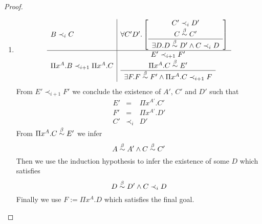 \begin{lemma}
\begin{proof}
\begin{enumerate}
        \item
            $$
            \begin{array}{l|l}
                B \prec_i C
                &
                \forall C' D'.
                \left[
                    \begin{array}{c} 
                        C' \prec_i D'
                        \\
                        C \stackrel{\beta}{\sim} C'
                     \\ \hline 
                        \exists D. D \stackrel{\beta}{\sim} D' \land C \prec_i D
                    \end{array}
                \right]
                \\
                \hline
                \Pi x^A. B \prec_{i+1} \Pi x^A.C
                &
                \begin{array}{c} 
                    E' \prec_{i+1} F'
                    \\
                    \Pi x^A.C \stackrel{\beta}{\sim} E'
                 \\ \hline 
                    \exists F.
                    F \stackrel{\beta}{\sim} F'
                    \land
                    \Pi x^A. C \prec_{i+1} F
                \end{array}
            \end{array}
            $$
            From $E' \prec_{i+1} F'$ we conclude the existence of $A'$, $C'$ and
            $D'$ such that
            $$
            \begin{array}{lll}
                E' &=& \Pi x^{A'}. C'
                \\
                F' &=& \Pi x^{A'}. D'
                \\
                C' &\prec_i& D'
            \end{array}
            $$
            From $\Pi x^A.C \stackrel{\beta}{\sim} E'$ we infer
            $$
                A \stackrel{\beta}{\sim} A' \land C \stackrel{\beta}{\sim} C'
            $$
            Then we use the induction hypothesis to infer the existence of some
            $D$ which satisfies
            $$
                D \stackrel{\beta}{\sim} D' \land C \prec_i D
            $$
            Finally we use $F := \Pi x^A. D$ which satisfies the final goal.
        \end{enumerate}
    \end{proof}
\end{lemma}



